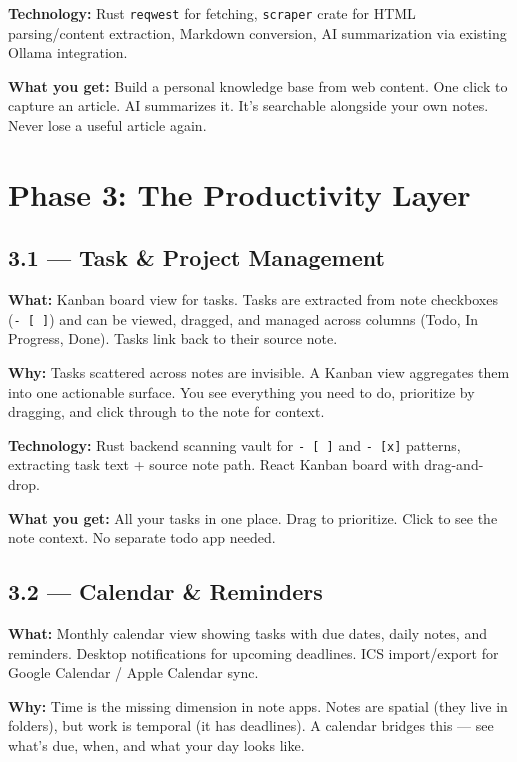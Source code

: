 \documentclass[11pt,a4paper]{article}
\begin{document}
\textbf{Technology:} Rust \texttt{reqwest} for fetching, \texttt{scraper} crate for HTML parsing/content extraction, Markdown conversion, AI summarization via existing Ollama integration.

\textbf{What you get:} Build a personal knowledge base from web content. One click to capture an article. AI summarizes it. It's searchable alongside your own notes. Never lose a useful article again.

\section{Phase 3: The Productivity Layer}

\subsection{3.1 --- Task \& Project Management}

\textbf{What:} Kanban board view for tasks. Tasks are extracted from note checkboxes (\texttt{- [ ]}) and can be viewed, dragged, and managed across columns (Todo, In Progress, Done). Tasks link back to their source note.

\textbf{Why:} Tasks scattered across notes are invisible. A Kanban view aggregates them into one actionable surface. You see everything you need to do, prioritize by dragging, and click through to the note for context.

\textbf{Technology:} Rust backend scanning vault for \texttt{- [ ]} and \texttt{- [x]} patterns, extracting task text + source note path. React Kanban board with drag-and-drop.

\textbf{What you get:} All your tasks in one place. Drag to prioritize. Click to see the note context. No separate todo app needed.

\subsection{3.2 --- Calendar \& Reminders}

\textbf{What:} Monthly calendar view showing tasks with due dates, daily notes, and reminders. Desktop notifications for upcoming deadlines. ICS import/export for Google Calendar / Apple Calendar sync.

\textbf{Why:} Time is the missing dimension in note apps. Notes are spatial (they live in folders), but work is temporal (it has deadlines). A calendar bridges this --- see what's due, when, and what your day looks like.
\end{document}
